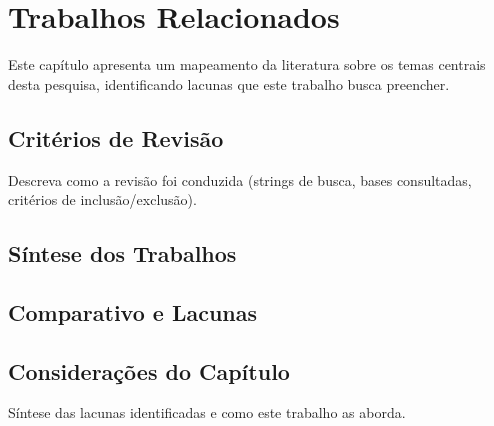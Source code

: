 
\chapter{Trabalhos Relacionados}
\label{cap:relacionados}

Este capítulo apresenta um mapeamento da literatura sobre os temas
centrais desta pesquisa, identificando lacunas que este trabalho
busca preencher.

\section{Critérios de Revisão}

Descreva como a revisão foi conduzida (strings de busca, bases
consultadas, critérios de inclusão/exclusão).

\section{Síntese dos Trabalhos}


\section{Comparativo e Lacunas}


\section{Considerações do Capítulo}

Síntese das lacunas identificadas e como este trabalho as aborda.
